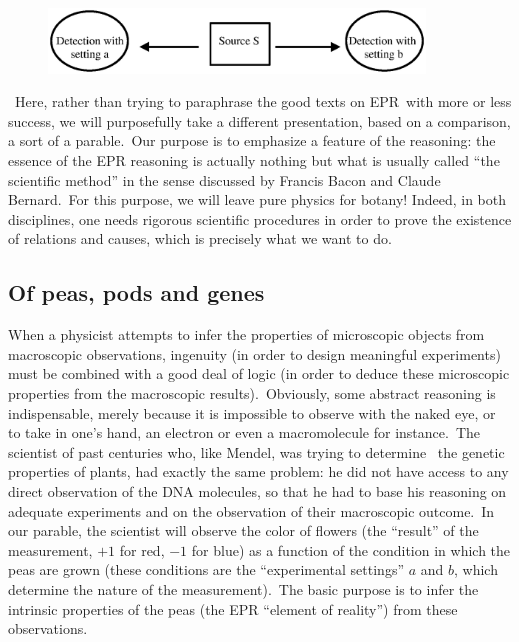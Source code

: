 \documentclass[12pt,onecolumn]{article}%
\begin{document}
\begin{figure}[ptb]
\begin{center}
\includegraphics[width=10cm]{fig1.ps}\newline
\end{center}
\par
\label{fig 1}\end{figure}

\ Here, rather than trying to paraphrase the good texts on EPR\ with more or
less success, we will purposefully take a different presentation, based on a
comparison, a sort of a parable.\ Our purpose is to emphasize a feature of the
reasoning: the essence of the EPR reasoning is actually nothing but what is
usually called ``the scientific method'' in the sense discussed by Francis
Bacon and Claude Bernard.\ For this purpose, we will leave pure physics for
botany! Indeed, in both disciplines, one needs rigorous scientific procedures
in order to prove the existence of relations and causes, which is precisely
what we want to do.

\subsection{Of peas, pods and genes}

\label{peas}

When a physicist attempts to infer the properties of microscopic objects from
macroscopic observations, ingenuity (in order to design meaningful
experiments) must be combined with a good deal of logic (in order to deduce
these microscopic properties from the macroscopic results).\ Obviously, some
abstract reasoning is indispensable, merely because it is impossible to
observe with the naked eye, or to take in one's hand, an electron or even a
macromolecule for instance.\ The scientist of past centuries who, like Mendel,
was trying to determine \ the genetic properties of plants, had exactly the
same problem: he did not have access to any direct observation of the DNA
molecules, so that he had to base his reasoning on adequate experiments and on
the observation of their macroscopic outcome.\ In our parable, the scientist
will observe the color of flowers (the ``result'' of the measurement, $+1$ for
red, $-1$ for blue) as a function of the condition in which the peas are grown
(these conditions are the ``experimental settings'' $a$ and $b$, which
determine the nature of the measurement).\ The basic purpose is to infer the
intrinsic properties of the peas (the EPR ``element of reality'') from these observations.
\end{document}
